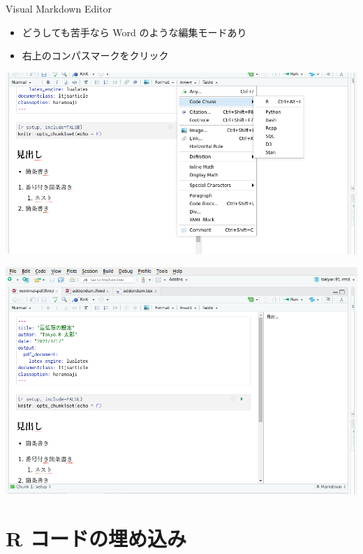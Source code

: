 \documentclass[
  ignorenonframetext,
]{beamer}
\providecommand{\tightlist}{%
  \setlength{\itemsep}{0pt}\setlength{\parskip}{0pt}}
\begin{document}
\begin{frame}{Visual Markdown Editor}
\protect\hypertarget{visual-markdown-editor}{}
\begin{itemize}
\tightlist
\item
  どうしても苦手なら Word のような編集モードあり
\item
  右上のコンパスマークをクリック
\end{itemize}

\begin{center}\includegraphics[width=1\linewidth,height=1\textheight,keepaspectratio]{img/visual-editor1} \end{center}

\begin{center}\includegraphics[width=1\linewidth,height=1\textheight,keepaspectratio]{img/visual-editor2} \end{center}
\end{frame}

\hypertarget{r-ux30b3ux30fcux30c9ux306eux57cbux3081ux8fbcux307f}{%
\section{R コードの埋め込み}\label{r-ux30b3ux30fcux30c9ux306eux57cbux3081ux8fbcux307f}}
\end{document}
